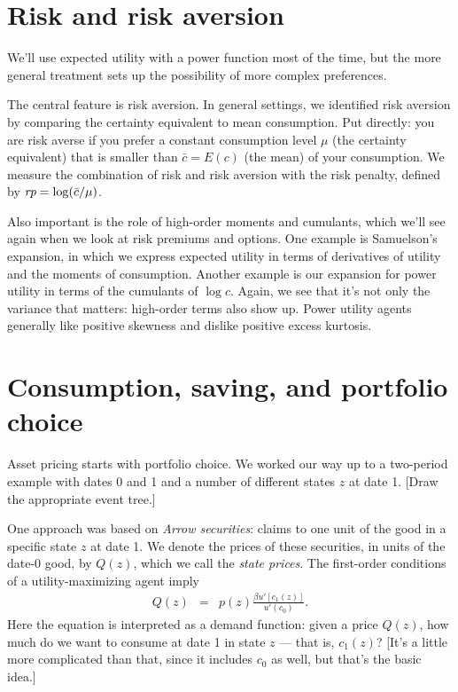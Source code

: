 \documentclass[11pt]{article}
\begin{document}
\section*{Risk and risk aversion}

We'll use expected utility with a power function most of the time,
but the more general treatment sets up
the possibility of more complex preferences.

The central feature is risk aversion.
In general settings, we identified risk aversion by
comparing the certainty equivalent to mean consumption.
Put directly:  you are risk averse if you prefer a constant consumption
level $\mu$ (the certainty equivalent) that is smaller than $\bar{c} = E(c)$ (the mean)
of your consumption.
We measure the combination of risk and risk aversion with the risk penalty,
defined by $ \mbox{\it rp} = \log (\bar{c}/\mu)$.

Also important is the role of high-order moments and cumulants,
which we'll see again when we look at risk premiums and options.
One example is Samuelson's expansion, in which we express
expected utility in terms of derivatives of utility and the moments of consumption.
Another example is our expansion for power utility in terms
of the cumulants of $\log c$.
Again, we see that it's not only the variance that matters:
high-order terms also show up.
Power utility agents generally like positive skewness and dislike
positive excess kurtosis.


\section*{Consumption, saving, and portfolio choice}

Asset pricing starts with portfolio choice.
We worked our way up to a two-period example
with dates 0 and 1 and a number of different states $z$ at date 1.
[Draw the appropriate event tree.]

One approach was based on {\it Arrow securities\/}:
claims to one unit of the good in a specific state $z$ at date 1.
We denote the prices of these securities, in units of the date-0 good, by
$Q(z)$, which we call the {\it state prices\/}.
The first-order conditions of a utility-maximizing agent  imply
\begin{eqnarray}
    Q(z) &=& p(z) \frac{\beta u'[c_1(z)]}{u'(c_0) }.
    \label{eq:state-prices=mrs}
\end{eqnarray}
Here the equation is interpreted as a demand function: given a price $Q(z)$,
how much do we want to consume at date 1 in state $z$ --- that is, $c_1(z)$?
[It's a little more complicated than that, since it includes $c_0$ as well,
but that's the basic idea.]
\end{document}
